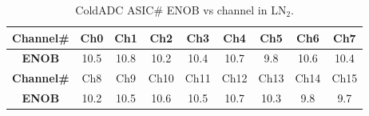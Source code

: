 \begin{table}[htb]
\centering
\begin{tabular}{|c|c|c|c|c|c|c|c|c|}
\hline
\textbf{ Channel\# } & Ch0&Ch1&Ch2&Ch3 &Ch4 &Ch5 &Ch6 &Ch7 \\ \hline 
\textbf{ ENOB } & 10.5 & 10.8 & 10.2 & 10.4 & 10.7 & 9.8 & 10.6 & 10.4\\ \hline \hline
\textbf{ Channel\# } & Ch8&Ch9&Ch10&Ch11 &Ch12 &Ch13 &Ch14 &Ch15 \\ \hline
\textbf{ ENOB } & 10.2 & 10.5  & 10.6 & 10.5 & 10.7 & 10.3 & 9.8 & 9.7 \\ \hline
\end{tabular}
\caption{ColdADC ASIC\# ENOB vs channel in LN$_2$.}
\label{tab:adc_enob}
\end{table}


